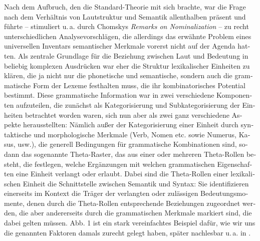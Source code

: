 \documentclass[output=paper,colorlinks,citecolor=brown]{langscibook}
\begin{document}
\begin{otherlanguage}{german}
Nach dem Aufbruch, den die Standard-Theorie mit sich brachte, war die Frage nach dem Verhältnis von Lautstruktur und Semantik allenthalben präsent und führte -- stimuliert u.\,a. durch Chomskys \textit{Remarks on Nominalization} \citep{Chomsky1970} -- zu recht unterschiedlichen Analysevorschlägen, die allerdings das erwähnte Problem eines universellen Inventars semantischer Merkmale vorerst nicht auf der Agenda hatten. Als zentrale Grundlage für die Beziehung zwischen Laut und Bedeutung in beliebig komplexen Ausdrücken war eher die Struktur lexikalischer Einheiten zu klären, die ja nicht nur die phonetische und semantische, sondern auch die grammatische Form der Lexeme festhalten muss, die ihr kombinatorisches Potential bestimmt. Diese grammatische Information war in zwei verschiedene Komponenten aufzuteilen, die zunächst als Kategorisierung und Subkategorisierung der Einheiten betrachtet worden waren, sich nun aber als zwei ganz verschiedene Aspekte herausstellten: Nämlich außer der Kategorisierung einer Einheit durch syntaktische und morphologische Merkmale (Verb, Nomen etc. sowie Numerus, Kasus, usw.), die generell Bedingungen für grammatische Kombinationen sind, sodann das sogenannte \glqq Theta-Raster\grqq, das aus einer oder mehreren Theta-Rollen besteht, die festlegen, welche Ergänzungen mit welchen grammatischen Eigenschaften eine Einheit verlangt oder erlaubt. Dabei sind die Theta-Rollen einer lexikalischen Einheit die Schnittstelle zwischen Semantik und Syntax: Sie identifizieren einerseits im Kontext die Träger der verlangten oder zulässigen Bedeutungsmomente, denen durch die Theta-Rollen entsprechende Beziehungen zugeordnet werden, die aber andererseits durch die grammatischen Merkmale markiert sind, die dabei gelten müssen. Abb. 1 ist ein stark vereinfachtes Beispiel dafür, wie wir uns die genannten Faktoren damals zurecht gelegt haben, später nachlesbar u.\,a. in \citet{Bierwisch1988,Bierwisch1990}.



\end{otherlanguage}
\end{document}
